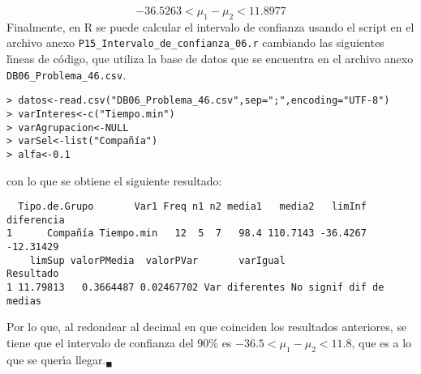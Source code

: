 \begin{solucion}
 \begin{equation*}
  -36.5263 < \mu_1 - \mu_2 < 11.8977
 \end{equation*}
 Finalmente, en R se puede calcular el intervalo de confianza usando el script en el archivo anexo \texttt{P15\_Intervalo\_de\_confianza\_06.r} cambiando las siguientes l\'{\i}neas de c\'odigo, que utiliza la base de datos que se encuentra en el archivo anexo \texttt{DB06\_Problema\_46.csv}.
 \begin{verbatim}
> datos<-read.csv("DB06_Problema_46.csv",sep=";",encoding="UTF-8")
> varInteres<-c("Tiempo.min")
> varAgrupacion<-NULL
> varSel<-list("Compañía")
> alfa<-0.1
 \end{verbatim}
 \vspace{-0.5cm}
 con lo que se obtiene el siguiente resultado:
 \begin{verbatim}
  Tipo.de.Grupo       Var1 Freq n1 n2 media1   media2   limInf diferencia
1      Compañía Tiempo.min   12  5  7   98.4 110.7143 -36.4267  -12.31429
    limSup valorPMedia  valorPVar       varIgual               Resultado
1 11.79813   0.3664487 0.02467702 Var diferentes No signif dif de medias
 \end{verbatim}
 \vspace{-0.5cm}
 Por lo que, al redondear al decimal en que coinciden los resultados anteriores, se tiene que el intervalo de confianza del $90\%$ es $-36.5 < \mu_1 - \mu_2 < 11.8$, que es a lo que se quer\'{\i}a llegar.${}_{\blacksquare}$
\end{solucion}
